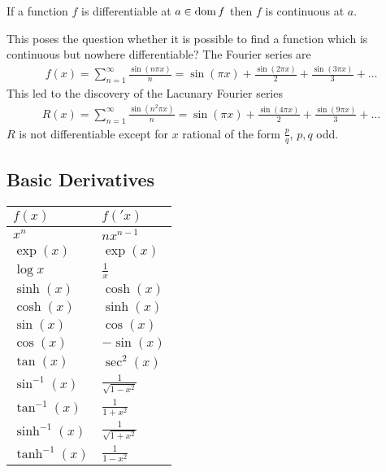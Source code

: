 \begin{tm}
If a function $f$ is differentiable at $a \in \operatorname{dom} f$ then $f$ is continuous at $a$. 
\end{tm}
This poses the question whether it is possible to find a function which is continuous but nowhere differentiable?
The Fourier series are
\begin{align*}
f(x) = \sum_{n=1}^\infty \frac{\sin(n\pi x)} n = \sin(\pi x) + \frac{\sin(2\pi x )}{2} + \frac{\sin(3 \pi x)}{3} + \dots 
\end{align*}
This led to the discovery of the Lacunary Fourier series
\begin{align*}
R(x) = \sum_{n=1}^\infty \frac{\sin(n^2\pi x)} n = \sin(\pi x) + \frac{\sin(4\pi x )}{2} + \frac{\sin(9 \pi x)}{3} + \dots 
\end{align*}
$R$ is not differentiable except for $x$ rational of the form $\frac p q$, $p,q$ odd.
\subsection{Basic Derivatives}
\begin{center}
\begin{tabularx}{.5\textwidth}{XX}
\toprule
$ f(x)$ & $f('x)$ \\
\toprule
 $x^n$ & $nx^{n-1}$ \\
\midrule
$\exp(x)$ & $\exp(x)$ \\
$\log x$ & $\frac 1 x$ \\
\midrule
$\sinh(x)$ & $\cosh (x) $\\
$\cosh (x)$ & $\sinh (x)$ \\
\midrule
$\sin(x)$ & $\cos(x) $\\
$\cos(x)$ & $-\sin(x)$ \\
$\tan(x)$ & $\sec^2(x)$ \\
\midrule
$\sin^{-1}(x)$ & $\frac 1 {\sqrt{1-x^2}} $  \\
$\tan^{-1}(x)$ & $\frac 1 {1+x^2}$ \\
\midrule 
$\sinh^{-1}(x)$ & $\frac 1 {\sqrt{1+x^2}} $ \\
$\tanh^{-1}(x)$ & $\frac 1 {1-x^2}$ \\
\bottomrule
\end{tabularx}
\end{center}
